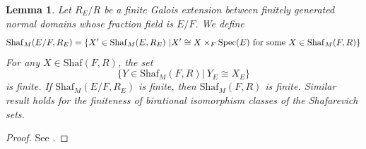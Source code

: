 \documentclass[11pt,reqno,oneside]{amsart}
\numberwithin{equation}{section}
\newtheorem{lemma}[theorem]{Lemma}
\theoremstyle{definition}
\DeclareMathOperator{\Spec}{Spec}
\newcommand{\Sha}{\mathrm{Shaf}}
\begin{document}
\begin{lemma}\label{red-fin-ext}
Let $R_E/R$ be a finite Galois extension between finitely generated normal domains whose fraction field is $E/F$.  We define 
	\begin{equation*}
	\Sha_{M}(E/F,R_E)=\left\{  X'\in \Sha_M (E,R_E)~|X'\cong X\times_F \Spec(E) ~\hbox{for some}~ X \in \Sha_M(F, R) \right\}
	\end{equation*}
For any $X \in  \Sha(F, R)$, the set
	\begin{equation*}	
	\{Y\in \Sha_M(F,R)|~Y_E \cong X_E\}
	\end{equation*}
	is finite. 	If $\Sha_{M}(E/F,R_E)$ is finite, then $\Sha_M(F,R)$ is finite. Similar result holds for the finiteness of birational isomorphism classes of the Shafarevich sets.
\end{lemma}
\begin{proof}
	See \cite[Lemma 4.1.4]{Sh17}.
\end{proof}
\end{document}
